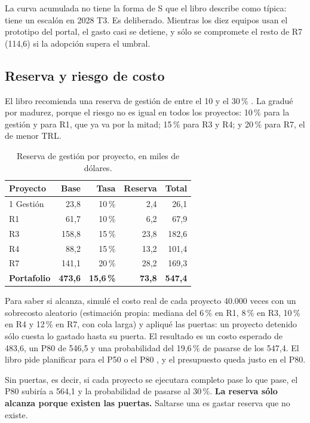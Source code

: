 \documentclass[11pt,letterpaper]{article}
\newcommand{\pct}{\,\%}
\begin{document}
La curva acumulada no tiene la forma de S que el libro describe como típica:
tiene un escalón en 2028 T3. Es deliberado. Mientras los diez equipos usan el
prototipo del portal, el gasto casi se detiene, y sólo se compromete el resto de
R7 (114,6) si la adopción supera el umbral.

\subsection*{Reserva y riesgo de costo}

El libro recomienda una reserva de gestión de entre el 10 y el 30\pct{}
\autocite[sec.~16.2.3]{deweck2022}. La gradué por madurez, porque el riesgo no es
igual en todos los proyectos: 10\pct{} para la gestión y para R1, que ya va por
la mitad; 15\pct{} para R3 y R4; y 20\pct{} para R7, el de menor TRL.

\begin{table}[H]
\centering
\footnotesize
\setlength{\tabcolsep}{6pt}
\caption{Reserva de gestión por proyecto, en miles de dólares.}
\label{tab:reserva}
\begin{tabular}{@{}lrrrr@{}}
\toprule
\textbf{Proyecto} & \textbf{Base} & \textbf{Tasa} & \textbf{Reserva} &
  \textbf{Total} \\
\midrule
1 Gestión & 23,8 & 10\pct & 2,4 & 26,1 \\
R1 & 61,7 & 10\pct & 6,2 & 67,9 \\
R3 & 158,8 & 15\pct & 23,8 & 182,6 \\
R4 & 88,2 & 15\pct & 13,2 & 101,4 \\
R7 & 141,1 & 20\pct & 28,2 & 169,3 \\
\midrule
\textbf{Portafolio} & \textbf{473,6} & \textbf{15,6\pct} & \textbf{73,8} &
  \textbf{547,4} \\
\bottomrule
\end{tabular}
\end{table}

Para saber si alcanza, simulé el costo real de cada proyecto 40.000 veces con
un sobrecosto aleatorio (estimación propia: mediana del 6\pct{} en R1, 8\pct{} en
R3, 10\pct{} en R4 y 12\pct{} en R7, con cola larga) y apliqué las puertas: un
proyecto detenido sólo cuesta lo gastado hasta su puerta. El resultado es un
costo esperado de 483,6, un P80 de 546,5 y una probabilidad del 19,6\pct{} de
pasarse de los 547,4. El libro pide planificar para el P50 o el P80
\autocite[sec.~16.3]{deweck2022}, y el presupuesto queda justo en el P80.

Sin puertas, es decir, si cada proyecto se ejecutara completo pase lo que pase,
el P80 subiría a 564,1 y la probabilidad de pasarse al 30\pct. \textbf{La
reserva sólo alcanza porque existen las puertas.} Saltarse una es gastar
reserva que no existe.
\end{document}
